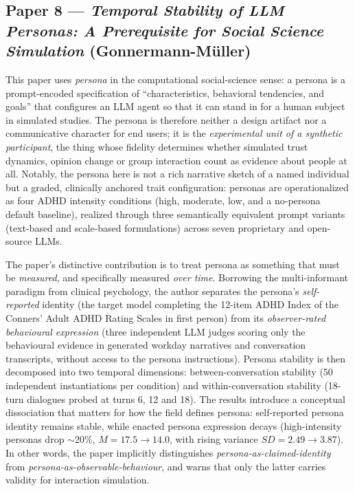 
\subsection*{Paper 8 --- \textit{Temporal Stability of LLM Personas: A Prerequisite for Social Science Simulation} (Gonnermann-Müller)}

This paper uses \emph{persona} in the computational social-science sense: a persona is a prompt-encoded specification of ``characteristics, behavioral tendencies, and goals'' that configures an LLM agent so that it can stand in for a human subject in simulated studies. The persona is therefore neither a design artifact nor a communicative character for end users; it is the \emph{experimental unit of a synthetic participant}, the thing whose fidelity determines whether simulated trust dynamics, opinion change or group interaction count as evidence about people at all. Notably, the persona here is not a rich narrative sketch of a named individual but a graded, clinically anchored trait configuration: personas are operationalized as four ADHD intensity conditions (high, moderate, low, and a no-persona default baseline), realized through three semantically equivalent prompt variants (text-based and scale-based formulations) across seven proprietary and open-source LLMs.

The paper's distinctive contribution is to treat persona as something that must be \emph{measured}, and specifically measured \emph{over time}. Borrowing the multi-informant paradigm from clinical psychology, the author separates the persona's \emph{self-reported} identity (the target model completing the 12-item ADHD Index of the Conners' Adult ADHD Rating Scales in first person) from its \emph{observer-rated behavioural expression} (three independent LLM judges scoring only the behavioural evidence in generated workday narratives and conversation transcripts, without access to the persona instructions). Persona stability is then decomposed into two temporal dimensions: between-conversation stability (50 independent instantiations per condition) and within-conversation stability (18-turn dialogues probed at turns 6, 12 and 18). The results introduce a conceptual dissociation that matters for how the field defines persona: self-reported persona identity remains stable, while enacted persona expression decays (high-intensity personas drop $\sim$20\%, $M=17.5 \rightarrow 14.0$, with rising variance $SD=2.49 \rightarrow 3.87$). In other words, the paper implicitly distinguishes \emph{persona-as-claimed-identity} from \emph{persona-as-observable-behaviour}, and warns that only the latter carries validity for interaction simulation.

